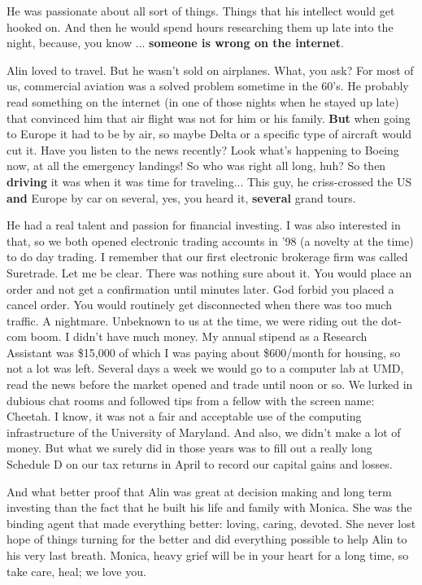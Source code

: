 \documentclass[12pt]{article}
\begin{document}
\bigskip
He was passionate about all sort of things.  Things that his intellect 
would get hooked on.  And then he would spend hours researching them 
up late into the night, because, you know ... {\bf someone is wrong 
on the internet}. 

\bigskip
Alin loved to travel.  But he wasn't sold on airplanes. What, 
you ask?  For most of us, commercial aviation was a solved problem 
sometime in the 60's.  He probably read something on the internet 
(in one of those nights when he stayed up late) that convinced him that 
air flight was not for him or his family.  {\bf But} when going to Europe
it had to be by air, so maybe Delta or a specific type of aircraft would 
cut it.  Have you listen to the news recently?  Look what's happening 
to Boeing now, at all the emergency landings!  So who was right all long, 
huh?  So then {\bf driving} it was when it was time for traveling...  
This guy, he criss-crossed the US {\bf and} Europe by car on several, 
yes, you heard it, {\bf several} grand tours.  

\bigskip
He had a real talent and passion for financial investing.  I was also 
interested in that, so we both opened electronic trading accounts in '98 
(a novelty at the time) to do day trading.  I remember that our first 
electronic brokerage firm was called Suretrade.  Let me be clear.  There 
was nothing sure about it.  You would place an order and not get a 
confirmation until minutes later.  God forbid you placed a cancel order.  
You would routinely get disconnected when there was too much traffic.  
A nightmare.  Unbeknown to us at the time, we were riding out the dot-com boom.  
I didn't have much money.  My annual stipend as a Research Assistant 
was \$15,000 of which I was paying about \$600/month for housing, 
so not a lot was left.  Several days a week we would go to a computer lab 
at UMD, read the news before the market opened and trade until noon or so.  
We lurked in dubious chat rooms and followed tips from a fellow with 
the screen name: Cheetah.  I know, it was not a fair and acceptable 
use of the computing infrastructure of the University of Maryland.  
And also, we didn't make a lot of money.  But what we surely did in those 
years was to fill out a really long Schedule D on our tax returns in 
April to record our capital gains and losses.

\bigskip
And what better proof that Alin was great at decision making and long term 
investing than the fact that he built his life and family with Monica.  
She was the binding agent that made everything better: loving, 
caring, devoted.  She never lost hope of things turning for the better 
and did everything possible to help Alin to his very last breath.  Monica, 
heavy grief will be in your heart for a long time, so take care, heal; 
we love you.  
\end{document}
